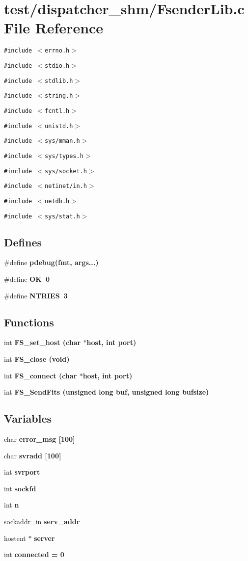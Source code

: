\section{test/dispatcher\_\-shm/Fsender\-Lib.c File Reference}
\label{shm_2FsenderLib_8c}
{\tt \#include $<$errno.h$>$}\par
{\tt \#include $<$stdio.h$>$}\par
{\tt \#include $<$stdlib.h$>$}\par
{\tt \#include $<$string.h$>$}\par
{\tt \#include $<$fcntl.h$>$}\par
{\tt \#include $<$unistd.h$>$}\par
{\tt \#include $<$sys/mman.h$>$}\par
{\tt \#include $<$sys/types.h$>$}\par
{\tt \#include $<$sys/socket.h$>$}\par
{\tt \#include $<$netinet/in.h$>$}\par
{\tt \#include $<$netdb.h$>$}\par
{\tt \#include $<$sys/stat.h$>$}\par
\subsection*{Defines}
\begin{CompactItemize}
\item 
\#define \bf{pdebug}(fmt, args...)
\item 
\#define \bf{OK}~0
\item 
\#define \bf{NTRIES}~3
\end{CompactItemize}
\subsection*{Functions}
\begin{CompactItemize}
\item 
int \bf{FS\_\-set\_\-host} (char $\ast$host, int port)
\item 
int \bf{FS\_\-close} (void)
\item 
int \bf{FS\_\-connect} (char $\ast$host, int port)
\item 
int \bf{FS\_\-Send\-Fits} (unsigned long buf, unsigned long bufsize)
\end{CompactItemize}
\subsection*{Variables}
\begin{CompactItemize}
\item 
char \bf{error\_\-msg} [100]
\item 
char \bf{svradd} [100]
\item 
int \bf{svrport}
\item 
int \bf{sockfd}
\item 
int \bf{n}
\item 
sockaddr\_\-in \bf{serv\_\-addr}
\item 
hostent $\ast$ \bf{server}
\item 
int \bf{connected} = 0
\end{CompactItemize}


